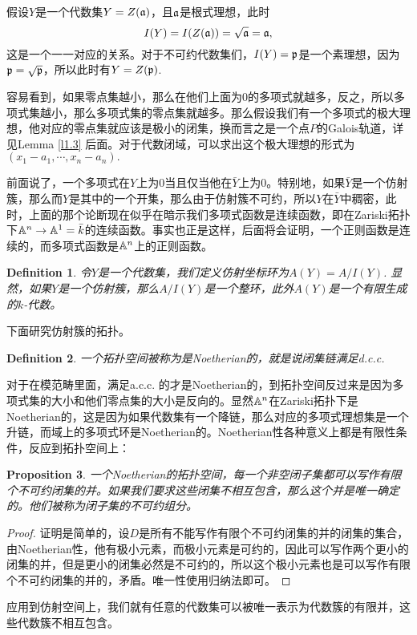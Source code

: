 \documentclass[9pt]{extbook}
\theoremstyle{plain}%
\newtheorem{defi}{Definition}[section]%
\newtheorem{pro}[defi]{Proposition}%
\begin{document}
假设$Y$是一个代数集$Y=Z(\mathfrak{a})$，且$\mathfrak{a}$是根式理想，此时
\[
I(Y)=I(Z(\mathfrak{a}))=\sqrt{\mathfrak{a}}=\mathfrak{a},
\]
这是一个一一对应的关系。对于不可约代数集们，$I(Y)=\mathfrak{p}$是一个素理想，因为$\mathfrak{p}=\sqrt{\mathfrak{p}}$，所以此时有$Y=Z(\mathfrak{p})$.

容易看到，如果零点集越小，那么在他们上面为0的多项式就越多，反之，所以多项式集越小，那么多项式集的零点集就越多。那么假设我们有一个多项式的极大理想，他对应的零点集就应该是极小的闭集，换而言之是一个点$P$的Galois轨道，详见Lemma \ref{l1.3} 后面。对于代数闭域，可以求出这个极大理想的形式为$(x_1-a_1,\cdots,x_n-a_n).$

前面说了，一个多项式在$Y$上为$0$当且仅当他在$\bar{Y}$上为$0$。特别地，如果$\bar{Y}$是一个仿射簇，那么而$Y$是其中的一个开集，那么由于仿射簇不可约，所以$Y$在$\bar{Y}$中稠密，此时，上面的那个论断现在似乎在暗示我们多项式函数是连续函数，即在Zariski拓扑下$\mathbb{A}^n\to \mathbb{A}^1=\bar{k}$的连续函数。事实也正是这样，后面将会证明，一个正则函数是连续的，而多项式函数是$\mathbb{A}^n$上的正则函数。

\begin{defi}
令$Y$是一个代数集，我们定义仿射坐标环为$A(Y)=A/I(Y)$.
显然，如果$Y$是一个仿射簇，那么$A/I(Y)$是一个整环，此外$A(Y)$是一个有限生成的$k$-代数。
\end{defi}

下面研究仿射簇的拓扑。

\begin{defi}
	一个拓扑空间被称为是Noetherian的，就是说闭集链满足d.c.c.
\end{defi}
对于在模范畴里面，满足a.c.c.
的才是Noetherian的，到拓扑空间反过来是因为多项式集的大小和他们零点集的大小是反向的。显然$\mathbb{A}^n$在Zariski拓扑下是Noetherian的，这是因为如果代数集有一个降链，那么对应的多项式理想集是一个升链，而域上的多项式环是Noetherian的。Noetherian性各种意义上都是有限性条件，反应到拓扑空间上：

\begin{pro}
	一个Noetherian的拓扑空间，每一个非空闭子集都可以写作有限个不可约闭集的并。如果我们要求这些闭集不相互包含，那么这个并是唯一确定的。他们被称为闭子集的不可约组分。
\end{pro}
\begin{proof}
证明是简单的，设$D$是所有不能写作有限个不可约闭集的并的闭集的集合，由Noetherian性，他有极小元素，而极小元素是可约的，因此可以写作两个更小的闭集的并，但是更小的闭集必然是不可约的，所以这个极小元素也是可以写作有限个不可约闭集的并的，矛盾。唯一性使用归纳法即可。
\end{proof}
应用到仿射空间上，我们就有任意的代数集可以被唯一表示为代数簇的有限并，这些代数簇不相互包含。
\end{document}
